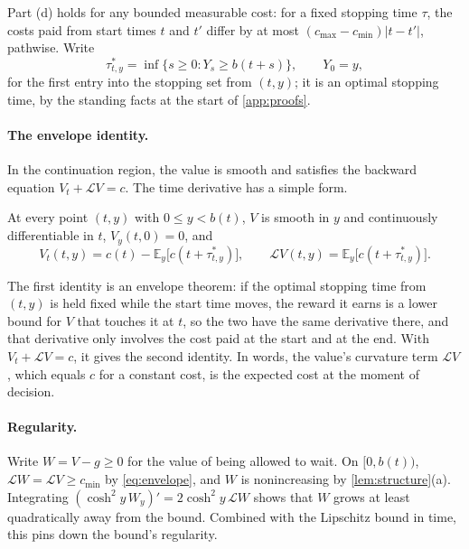 \documentclass[11pt]{article}
\theoremstyle{definition}
\theoremstyle{remark}
\newcommand{\E}{\mathbb{E}}
\newcommand{\Lop}{\mathcal{L}}
\begin{document}
Part (d) holds for any bounded measurable cost: for a fixed stopping time $\tau$, the costs paid
from start times $t$ and $t'$ differ by at most $(c_{\max} - c_{\min})|t - t'|$, pathwise. Write
\begin{equation}
  \tau^*_{t,y} = \inf\{s \ge 0 : Y_s \ge b(t+s)\}, \qquad Y_0 = y,
\end{equation}
for the first entry into the stopping set from $(t, y)$; it is an optimal stopping time, by the
standing facts at the start of \cref{app:proofs}.

\paragraph{The envelope identity.}
In the continuation region, the value is smooth and satisfies the backward equation
$V_t + \Lop V = c$. The time derivative has a simple form.

\begin{lemma}
\label{lem:envelope}
At every point $(t, y)$ with $0 \le y < b(t)$, $V$ is smooth in $y$ and continuously
differentiable in $t$, $V_y(t, 0) = 0$, and
\begin{equation}
  V_t(t, y) = c(t) - \E_y\bigl[c(t + \tau^*_{t,y})\bigr], \qquad
  \Lop V(t, y) = \E_y\bigl[c(t + \tau^*_{t,y})\bigr].
  \label{eq:envelope}
\end{equation}
\end{lemma}

The first identity is an envelope theorem: if the optimal stopping time from $(t, y)$ is held
fixed while the start time moves, the reward it earns is a lower bound for $V$ that touches it at
$t$, so the two have the same derivative there, and that derivative only involves the cost paid at
the start and at the end. With $V_t + \Lop V = c$, it gives the second identity. In words, the
value's curvature term $\Lop V$, which equals $c$ for a constant cost, is the expected cost
at the moment of decision.

\paragraph{Regularity.}
Write $W = V - g \ge 0$ for the value of being allowed to wait. On $[0, b(t))$,
$\Lop W = \Lop V \ge c_{\min}$ by \eqref{eq:envelope}, and $W$ is nonincreasing by
\cref{lem:structure}(a). Integrating $(\cosh^2 y\,W_y)' = 2\cosh^2 y\,\Lop W$ shows that $W$ grows at
least quadratically away from the bound. Combined with the Lipschitz bound in time, this pins
down the bound's regularity.
\end{document}
